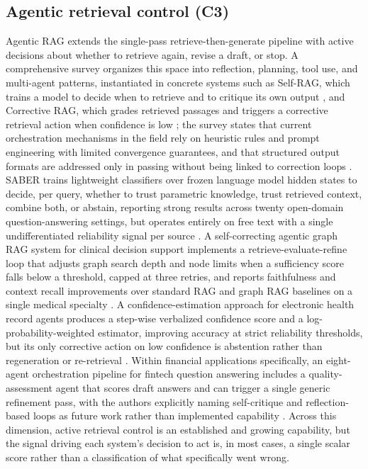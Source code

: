 \documentclass[10pt,twocolumn,letterpaper]{article}
\begin{document}
\subsection{Agentic retrieval control (C3)}

Agentic RAG extends the single-pass retrieve-then-generate pipeline with active decisions about whether to retrieve again, revise a draft, or stop. A comprehensive survey organizes this space into reflection, planning, tool use, and multi-agent patterns, instantiated in concrete systems such as Self-RAG, which trains a model to decide when to retrieve and to critique its own output \cite{selfrag}, and Corrective RAG, which grades retrieved passages and triggers a corrective retrieval action when confidence is low \cite{crag}; the survey states that current orchestration mechanisms in the field rely on heuristic rules and prompt engineering with limited convergence guarantees, and that structured output formats are addressed only in passing without being linked to correction loops \cite{agenticsurvey}. SABER trains lightweight classifiers over frozen language model hidden states to decide, per query, whether to trust parametric knowledge, trust retrieved context, combine both, or abstain, reporting strong results across twenty open-domain question-answering settings, but operates entirely on free text with a single undifferentiated reliability signal per source \cite{saber}. A self-correcting agentic graph RAG system for clinical decision support implements a retrieve-evaluate-refine loop that adjusts graph search depth and node limits when a sufficiency score falls below a threshold, capped at three retries, and reports faithfulness and context recall improvements over standard RAG and graph RAG baselines on a single medical specialty \cite{graphrag}. A confidence-estimation approach for electronic health record agents produces a step-wise verbalized confidence score and a log-probability-weighted estimator, improving accuracy at strict reliability thresholds, but its only corrective action on low confidence is abstention rather than regeneration or re-retrieval \cite{trustehr}. Within financial applications specifically, an eight-agent orchestration pipeline for fintech question answering includes a quality-assessment agent that scores draft answers and can trigger a single generic refinement pass, with the authors explicitly naming self-critique and reflection-based loops as future work rather than implemented capability \cite{fintech}. Across this dimension, active retrieval control is an established and growing capability, but the signal driving each system's decision to act is, in most cases, a single scalar score rather than a classification of what specifically went wrong.
\end{document}
